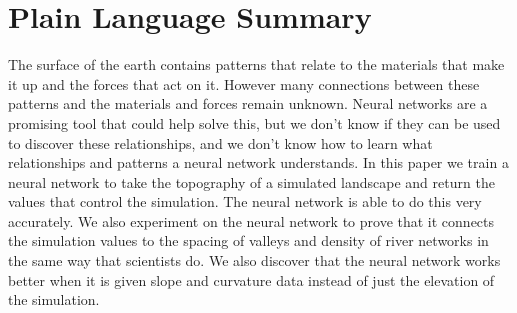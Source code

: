 \documentclass[draft]{agujournal2019}
\begin{document}
\begin{abstract}
Understanding the connection between topography and the processes and properties that shape landscapes both helps us better understand landscape evolution, and allows us to use topography to infer information relevant for a wide range of human activities.  However this remains challenging due to the complexity of spatial signals in topography.  Deep learning methods, like convolutional neural networks are a promising tool for capturing the spatial patterns necessary to correlation with the relevant process and property parameters, but remained under utilized because of the large amounts of data needed to train them and because of the belief that deep learning methods are ``black boxes'' that do not increase our theoretical understanding of the problems involved.  In this work, we train a convolutional neural network to invert topography generated from a landscape evolution model into the model parameters, and interpret the models learning.  We find that the neural network performs with a very high degree of accuracy, and has learned a relationship between the model parameters and the valley spacing and drainage density of the landscape that matches prior work.  We also find that the model learns more robustly when given topographic derivatives like slope and curvature, instead of just elevation.
\end{abstract}

\section*{Plain Language Summary}
The surface of the earth contains patterns that relate to the materials that make it up and the forces that act on it.  However many connections between these patterns and the materials and forces remain unknown.  Neural networks are a promising tool that could help solve this, but we don't know if they can be used to discover these relationships, and we don't know how to learn what relationships and patterns a neural network understands.  In this paper we train a neural network to take the topography of a simulated landscape and return the values that control the simulation.  The neural network is able to do this very accurately.  We also experiment on the neural network to prove that it connects the simulation values to the spacing of valleys and density of river networks in the same way that scientists do.  We also discover that the neural network works better when it is given slope and curvature data instead of just the elevation of the simulation.
\end{document}
